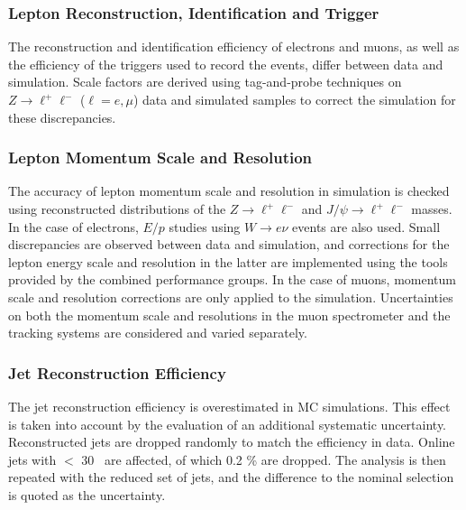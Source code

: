 \subsubsection{Lepton Reconstruction, Identification and Trigger}
\label{sec:syst_lepID}
The reconstruction and identification efficiency of electrons and
muons, as well as the efficiency of the triggers used to record the
events, differ between data and simulation.  Scale factors are derived using
tag-and-probe techniques on $Z\to \ell^+\ell^-$ ($\ell=e,\mu$) data
and simulated samples to correct the simulation for these discrepancies.

\subsubsection{Lepton Momentum Scale and Resolution}
The accuracy of lepton momentum scale and resolution in simulation is
checked using reconstructed distributions of the $Z\to \ell^+\ell^-$
and $J/\psi \to \ell^+\ell^-$ masses. In the case of electrons, $E/p$
studies using $W\to e\nu$ events are also used. Small discrepancies
are observed between data and simulation, and corrections for the
lepton energy scale and resolution in the latter are implemented using the tools provided by the combined performance groups.
In the case of muons, momentum scale and resolution
corrections are only applied to the simulation.  Uncertainties on both
the momentum scale and resolutions in the muon spectrometer and the tracking
systems are considered and varied separately.

\subsubsection{Jet Reconstruction Efficiency}
\label{sec:syst_jre}
The jet reconstruction efficiency is overestimated in MC simulations. This effect is taken into account by the evaluation of an additional systematic uncertainty. Reconstructed jets are dropped randomly to match the efficiency in data. Online jets with \pt $<$ 30 \GeV\ are affected, of which 0.2 \% are dropped. The analysis is then repeated with the reduced set of jets, and the difference to the nominal selection is quoted as the uncertainty.

